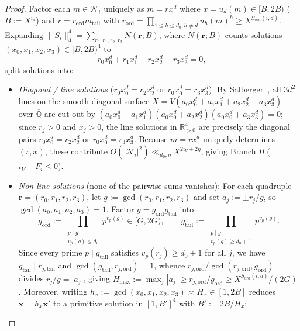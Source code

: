 \documentclass[11pt,a4paper]{amsart}
\theoremstyle{plain}
\theoremstyle{definition}
\theoremstyle{remark}
\newcommand{\Q}{\mathbb{Q}}
\newcommand{\R}{\mathbb{R}}
\begin{document}
\begin{proof}
Factor each $m \in \mathcal{N}_i$ uniquely as $m = r x^d$ where $x = u_d(m) \in [B, 2 B)$ ($B := X^{i_d}$) and $r = r_{\mathrm{ord}} m_{\mathrm{tail}}$ with $r_{\mathrm{ord}} = \prod_{1 \le h \le d_0, h \neq d} u_h(m)^h \ge X^{S_{\mathrm{ord}}(i,d)}$. Expanding $\|S_i\|_4^4 = \sum_{r_0,r_1,r_2,r_3} N(\mathbf{r}; B)$, where $N(\mathbf{r}; B)$ counts solutions $(x_0,x_1,x_2,x_3) \in [B, 2B)^4$ to
\begin{equation}\label{eq:diag_eq}
  r_0 x_0^d + r_1 x_1^d - r_2 x_2^d - r_3 x_3^d = 0,
\end{equation}
split solutions into:
\begin{itemize}[itemsep=2pt]
\item \emph{Diagonal / line solutions} ($r_0 x_0^d = r_2 x_2^d$ or $r_0 x_0^d = r_3 x_3^d$): By Salberger~\cite[Theorem~9.4(a) and Corollary~6.5]{Salberger2023}, all $3d^2$ lines on the smooth diagonal surface $X = V(a_0 x_0^d + a_1 x_1^d + a_2 x_2^d + a_3 x_3^d)$ over $\overline{\Q}$ are cut out by $(a_0 x_0^d + a_1 x_1^d)(a_0 x_0^d + a_2 x_2^d)(a_0 x_0^d + a_3 x_3^d) = 0$; since $r_j > 0$ and $x_j > 0$, the line solutions in $\R_{>0}^4$ are precisely the diagonal pairs $r_0 x_0^d = r_2 x_2^d$ or $r_0 x_0^d = r_3 x_3^d$. Because $m = r x^d$ uniquely determines $(r, x)$, these contribute $O(|\mathcal{N}_i|^2) \ll_{d_0,\eta} X^{2 i_V + 2\eta}$, giving Branch~0 ($i_V - F_i \le 0$).
\item \emph{Non-line solutions} (none of the pairwise sums vanishes): For each quadruple $\mathbf{r} = (r_0,r_1,r_2,r_3)$, let $g := \gcd(r_0,r_1,r_2,r_3)$ and set $a_j := \pm r_j / g$, so $\gcd(a_0,a_1,a_2,a_3) = 1$. Factor $g = g_{\mathrm{ord}} g_{\mathrm{tail}}$ into
\[
  g_{\mathrm{ord}} := \prod_{\substack{p \mid g \\ v_p(g) \le d_0}} p^{v_p(g)} \in [G, 2G),
  \qquad
  g_{\mathrm{tail}} := \prod_{\substack{p \mid g \\ v_p(g) \ge d_0 + 1}} p^{v_p(g)}.
\]
Since every prime $p \mid g_{\mathrm{tail}}$ satisfies $v_p(r_j) \ge d_0 + 1$ for all $j$, we have $g_{\mathrm{tail}} \mid r_{j,\mathrm{tail}}$ and $\gcd(g_{\mathrm{tail}}, r_{j,\mathrm{ord}}) = 1$, whence $r_{j,\mathrm{ord}}/\gcd(r_{j,\mathrm{ord}}, g_{\mathrm{ord}})$ divides $r_j/g = |a_j|$, giving $H_{\max} := \max_j |a_j| \ge r_{j,\mathrm{ord}}/g_{\mathrm{ord}} \ge X^{S_{\mathrm{ord}}(i,d)}/(2 G)$. Moreover, writing $h_x := \gcd(x_0,x_1,x_2,x_3) \asymp H_x \in [1, 2B]$ reduces $\mathbf{x} = h_x \mathbf{x}'$ to a primitive solution in $[1, B']^4$ with $B' := 2 B / H_x$:

\end{itemize}
\end{proof}
\end{document}
